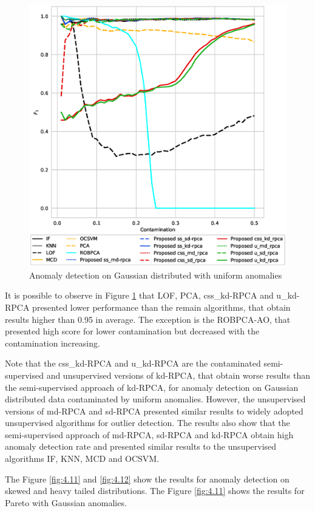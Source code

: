 \begin{figure}[h!]
	\centering
	\includegraphics[width=12cm]{figures/ch4/gaussian_f1_contamination.eps}
	\caption{Anomaly detection on Gaussian distributed with uniform anomalies}
	\label{fig:4.10}
\end{figure}

It is possible to observe in Figure \ref{fig:4.10} that LOF, PCA, css\_kd-RPCA and u\_kd-RPCA presented lower performance than the remain algorithms, that obtain results higher than 0.95 in average. The exception is the ROBPCA-AO, that presented high score for lower contamination but decreased with the contamination increasing. 

Note that the css\_kd-RPCA and u\_kd-RPCA are the contaminated semi-supervised and unsupervised versions of kd-RPCA, that obtain worse results than the semi-supervised approach of kd-RPCA, for anomaly detection on Gaussian distributed data contaminated by uniform anomalies. However, the unsupervised versions of md-RPCA and sd-RPCA presented similar results to widely adopted unsupervised algorithms for outlier detection. The results also show that the semi-supervised approach of md-RPCA, sd-RPCA and kd-RPCA obtain high anomaly detection rate and presented similar results to the unsupervised algorithms IF, KNN, MCD and OCSVM. 

The Figure \ref{fig:4.11} and \ref{fig:4.12} show the results for anomaly detection on skewed and heavy tailed distributions. The Figure \ref{fig:4.11} shows the results for Pareto with Gaussian anomalies.

